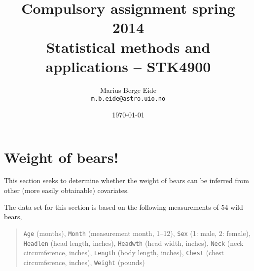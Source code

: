 \documentclass[a4paper,11pt]{article}
\date{\today}
\title{Compulsory assignment spring 2014\\ \small{Statistical methods and applications -- STK4900}}
\author{Marius Berge Eide \\ \texttt{m.b.eide@astro.uio.no}}
\begin{document}
\onecolumn
\maketitle{}


\section{Weight of bears!}
This section seeks to determine whether the weight of bears can be inferred from other (more easily obtainable) covariates.

The data set for this section is based on the following measurements of 54 wild bears,
\begin{quote}
    \texttt{Age} (months), \texttt{Month} (measurement month, 1--12), \texttt{Sex} (1: male, 2: female), \texttt{Headlen} (head length, inches), \texttt{Headwth} (head width, inches), \texttt{Neck} (neck circumference, inches), \texttt{Length} (body length, inches), \texttt{Chest} (chest circumference, inches), \texttt{Weight} (pounds)
\end{quote}
\end{document}
